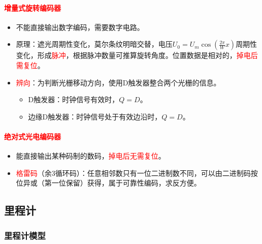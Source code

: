 \documentclass[
12pt, %
a4paper, 
oneside, %
]{scrartcl}
\begin{document}
\paragraph{\textcolor{red}{增量式旋转编码器}}
\begin{itemize}
\item 不能直接输出数字编码，需要数字电路。
\item 原理：遮光周期性变化，莫尔条纹明暗交替，电压$ U_0 = U_m \cos(\frac{2\pi}{W}x) $周期性变化，形成\textcolor{red}{脉冲}，根据脉冲数量可推算旋转角度。位置数据是相对的，\textcolor{red}{掉电后需复位}。
\item \textcolor{red}{辨向}：为判断光栅移动方向，使用D触发器整合两个光栅的信息。
\begin{itemize}
\item D触发器：时钟信号有效时，$ Q = D $。
\item 边缘D触发器：时钟信号处于有效边沿时，$ Q = D $。
\end{itemize}
\end{itemize}
\paragraph{\textcolor{red}{绝对式光电编码器}}
\begin{itemize}
\item 能直接输出某种码制的数码，\textcolor{red}{掉电后无需复位}。
\item \textcolor{red}{格雷码}（余$ 3 $循环码）：任意相邻数只有一位二进制数不同，可以由二进制码按位异或（第一位保留）获得，属于可靠性编码，求反方便。
\end{itemize}
\subsection[里程计]{里程计}
\subsubsection[里程计模型]{里程计模型}\label{sec:odometer}
\end{document}
